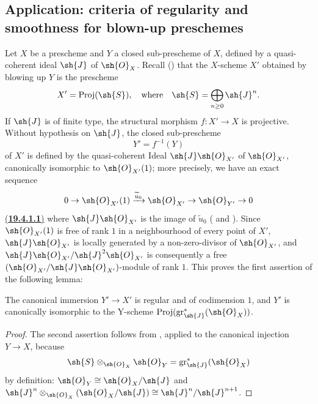 \subsection{Application: criteria of regularity and smoothness for blown-up preschemes}
\label{subsection:IV.19.4}


\begin{env}[19.4.1]
\label{IV.19.4.1}
Let $X$ be a prescheme and $Y$ a closed sub-prescheme of $X$, defined by a quasi-coherent ideal $\sh{J}$ of $\sh{O}_X$.
Recall () that the $X$-scheme $X'$ obtained by blowing up $Y$ is the prescheme
\[
  X'=\operatorname{Proj}(\sh{S}), \quad \text{where}\quad \sh{S}=\bigoplus_{n\geq 0}\sh{J}^n.
\]
If $\sh{J}$ is of finite type, the structural morphism $f:X'\to X$ is projective.
Without hypothesis on $\sh{J}$, the closed sub-prescheme
\[
  Y'=f^{-1}(Y)
\]
of $X'$ is defined by the quasi-coherent Ideal $\sh{J}\sh{O}_{X'}$ of $\sh{O}_{X'}$, canonically isomorphic to $\sh{O}_{X'}(1)$; more precisely, we have an exact sequence
\[
  0\to\sh{O}_{X'}(1)\xrightarrow{\widetilde{u}_0}\sh{O}_{X'}\to\sh{O}_{Y'}\to 0
\]
\hyperref[IV.19.4.1.1]{(\textbf{19.4.1.1})}
\label{IV.19.4.1.1}
where $\sh{J}\sh{O}_{X'}$ is the image of $\widetilde{u}_0$ ( and ).
Since $\sh{O}_{X'}(1)$ is free of rank $1$ in a neighbourhood of every point of $X'$, $\sh{J}\sh{O}_{X'}$ is locally generated by a non-zero-divisor of $\sh{O}_{X'}$, and $\sh{J}\sh{O}_{X'}/\sh{J}^2\sh{O}_{X'}$ is consequently a free $(\sh{O}_{X'}/\sh{J}\sh{O}_{X'})$-module of rank $1$.
This proves the first assertion of the following lemma:
\end{env}

\begin{lemma}[19.4.2]
\label{IV.19.4.2}
The canonical immersion $Y'\to X'$ is regular and of codimension $1$, and $Y'$ is canonically isomorphic to the Y-scheme $\operatorname{Proj}(\operatorname{gr}_\sh{J}^*(\sh{O}_X))$.
\end{lemma}

\begin{proof}
The second assertion follows from , applied to the canonical injection $Y\to X$, because
\[
  \sh{S}\otimes_{\sh{O}_X}\sh{O}_Y=\operatorname{gr}_{\sh{J}}^*(\sh{O}_X)
\]
by definition: $\sh{O}_Y\cong\sh{O}_X/\sh{J}$ and $\sh{J}^n\otimes_{\sh{O}_X}(\sh{O}_X/\sh{J})\cong\sh{J}^n/\sh{J}^{n+1}$.
\end{proof}

